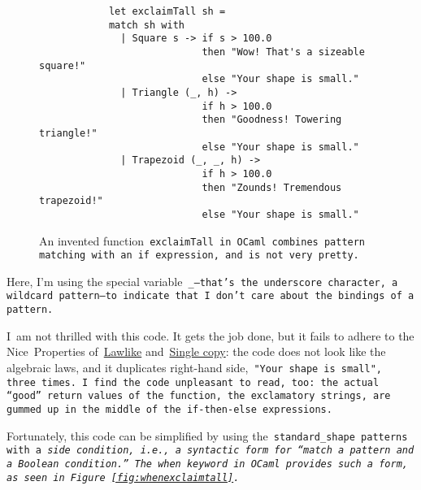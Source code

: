 \documentclass[manuscript,screen 12pt, nonacm]{acmart}
\begin{document}
    \begin{figure}[ht]
        \begin{verbatim}
            let exclaimTall sh =
            match sh with 
              | Square s -> if s > 100.0 
                            then "Wow! That's a sizeable square!"
                            else "Your shape is small." 
              | Triangle (_, h) -> 
                            if h > 100.0 
                            then "Goodness! Towering triangle!"
                            else "Your shape is small." 
              | Trapezoid (_, _, h) -> 
                            if h > 100.0
                            then "Zounds! Tremendous trapezoid!"
                            else "Your shape is small." 
            \end{verbatim}    
        \caption{An invented function~\tt{exclaimTall} in OCaml combines pattern
        matching with an~\tt{if} expression, and is not very pretty.}   
        \label{fig:ifexclaimtall}
    \end{figure}
    
    Here, I'm using the special variable~\tt{\_}---that's the underscore
    character, a wildcard pattern---to indicate that I~don't care about the
    bindings of a pattern. 

    I~am not thrilled with this code. It gets the job done, but it fails to
    adhere to the Nice~Properties of~\hyperref[p1]{Lawlike}
    and~\hyperref[p2]{Single copy}: the code does not look like the algebraic
    laws, and it duplicates right-hand side,~\tt{"Your shape is small"}, three
    times. I~find the code unpleasant to read, too: the actual “good” return
    values of the function, the exclamatory strings, are gummed up in the middle
    of the~\tt{if-then-else} expressions.
    
    Fortunately, this code can be simplified by using the~\tt{standard\_shape} patterns
    with a~\it{side condition}, i.e., a syntactic form for “match a pattern
    \it{and} a Boolean condition.” The~\tt{when} keyword in OCaml provides such
    a form, as seen in Figure~\ref{fig:whenexclaimtall}.
        
\end{document}
